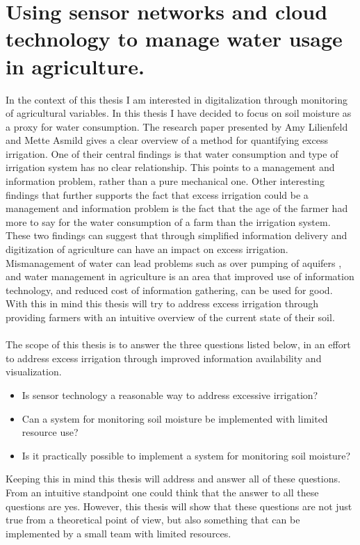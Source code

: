 \documentclass[]{uiophd}
\begin{document}
\section{Using sensor networks and cloud technology to manage water usage in agriculture.}

In the context of this thesis I am interested in digitalization through monitoring of agricultural variables. In this thesis I have decided to focus on soil moisture as a proxy for water consumption. The research paper presented by Amy Lilienfeld and Mette Asmild \cite{LILIENFELD200773} gives a clear overview of a method for quantifying excess irrigation. One of their central findings is that water consumption and type of irrigation system has no clear relationship. This points to a management and information problem, rather than a pure mechanical one. Other interesting findings that further supports the fact that excess irrigation could be a management and information problem is the fact that the age of the farmer had more to say for the water consumption of a farm than the irrigation system. These two findings can suggest that through simplified information delivery and digitization of agriculture can have an impact on excess irrigation. Mismanagement of water can lead problems such as over pumping of aquifers \cite{LILIENFELD200773}, and water management in agriculture is an area that improved use of information technology, and reduced cost of information gathering, can be used for good. With this in mind this thesis will try to address excess irrigation through providing farmers with an intuitive overview of the current state of their soil. 
\\\\
The scope of this thesis is to answer the three questions listed below, in an effort to address excess irrigation through improved information availability and visualization.


\begin{itemize}
  \item Is sensor technology a reasonable way to address excessive irrigation?
  \item Can a system for monitoring soil moisture be implemented with limited resource use?
  \item Is it practically possible to implement a system for monitoring soil moisture?
\end{itemize}
Keeping this in mind this thesis will address and answer all of these questions. From an intuitive standpoint one could think that the answer to all these questions are yes. However, this thesis will show that these questions are not just true from a theoretical point of view, but also something that can be implemented by a small team with limited resources.
\end{document}
